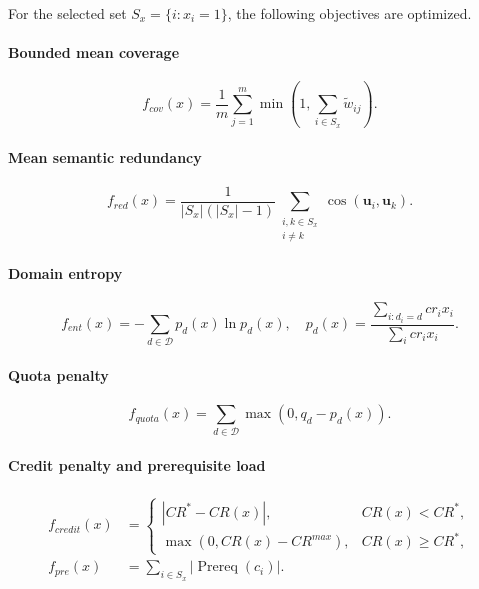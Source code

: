 \documentclass[twoside,11pt]{article}
\newcommand{\Dcal}{\mathcal{D}}
\begin{document}
For the selected set $S_x=\{i:x_i=1\}$, the following objectives are optimized.

\paragraph{Bounded mean coverage}
\begin{equation}
  f_{cov}(x)=\frac{1}{m}
  \sum_{j=1}^{m}
  \min\left(1,\sum_{i\in S_x}\tilde w_{ij}\right).
  \label{eq:objective-coverage}
\end{equation}

\paragraph{Mean semantic redundancy}
\begin{equation}
  f_{red}(x)=
  \frac{1}{|S_x|(|S_x|-1)}
  \sum_{\substack{i,k\in S_x\\i\ne k}}
  \cos(\mathbf{u}_i,\mathbf{u}_k).
  \label{eq:redundancy}
\end{equation}

\paragraph{Domain entropy}
\begin{equation}
  f_{ent}(x)=
  -\sum_{d\in\Dcal}p_d(x)\ln p_d(x),
  \quad
  p_d(x)=
  \frac{\sum_{i:d_i=d}cr_i x_i}
       {\sum_i cr_i x_i}.
  \label{eq:entropy}
\end{equation}

\paragraph{Quota penalty}
\begin{equation}
  f_{quota}(x)=
  \sum_{d\in\Dcal}\max(0,q_d-p_d(x)).
  \label{eq:quota-penalty}
\end{equation}

\paragraph{Credit penalty and prerequisite load}
\begin{align}
  f_{credit}(x)&=
  \begin{cases}
  |CR^\ast-CR(x)|, & CR(x)<CR^\ast,\\
  \max(0,CR(x)-CR^{max}), & CR(x)\ge CR^\ast,
  \end{cases}\\
  f_{pre}(x)&=\sum_{i\in S_x}|\operatorname{Prereq}(c_i)|.
  \label{eq:other-penalties}
\end{align}
\end{document}
